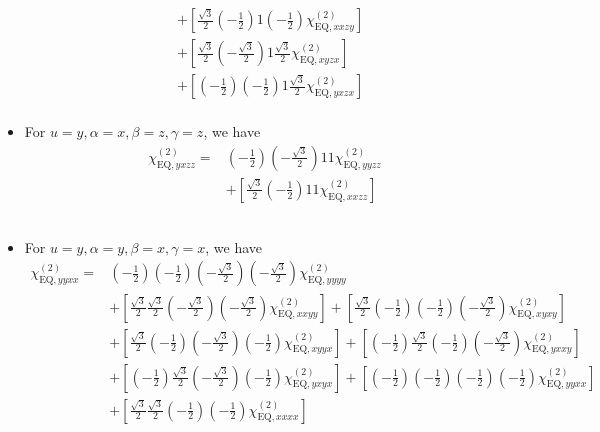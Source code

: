 \documentclass[UTF8,10pt,a4paper]{article}
\begin{document}
\begin{itemize}
\begin{align}
\nonumber&+\left[\frac{\sqrt{3}}{2}\left(-\frac{1}{2}\right)1\left(-\frac{1}{2}\right)\chi_{\text{EQ},xxzy}^{(2)}\right]\\
\nonumber&+\left[\frac{\sqrt{3}}{2}\left(-\frac{\sqrt{3}}{2}\right)1\frac{\sqrt{3}}{2}\chi_{\text{EQ},xyzx}^{(2)}\right]\\
\nonumber&+\left[\left(-\frac{1}{2}\right)\left(-\frac{1}{2}\right)1\frac{\sqrt{3}}{2}\chi_{\text{EQ},yxzx}^{(2)}\right]\\
&
\end{align}\normalsize
\item For $u=y,\alpha=x,\beta=z,\gamma=z$, we have
\footnotesize\begin{align}
\nonumber\chi_{\text{EQ},yxzz}^{(2)}=&\left(-\frac{1}{2}\right)\left(-\frac{\sqrt{3}}{2}\right)11\chi_{\text{EQ},yyzz}^{(2)}\\
\nonumber&+\left[\frac{\sqrt{3}}{2}\left(-\frac{1}{2}\right)11\chi_{\text{EQ},xxzz}^{(2)}\right]\\
\nonumber&\\
\nonumber&\\
&
\end{align}\normalsize
\item For $u=y,\alpha=y,\beta=x,\gamma=x$, we have
\footnotesize\begin{align}
\nonumber\chi_{\text{EQ},yyxx}^{(2)}=&\left(-\frac{1}{2}\right)\left(-\frac{1}{2}\right)\left(-\frac{\sqrt{3}}{2}\right)\left(-\frac{\sqrt{3}}{2}\right)\chi_{\text{EQ},yyyy}^{(2)}\\
\nonumber&+\left[\frac{\sqrt{3}}{2}\frac{\sqrt{3}}{2}\left(-\frac{\sqrt{3}}{2}\right)\left(-\frac{\sqrt{3}}{2}\right)\chi_{\text{EQ},xxyy}^{(2)}\right]+\left[\frac{\sqrt{3}}{2}\left(-\frac{1}{2}\right)\left(-\frac{1}{2}\right)\left(-\frac{\sqrt{3}}{2}\right)\chi_{\text{EQ},xyxy}^{(2)}\right]\\
\nonumber&+\left[\frac{\sqrt{3}}{2}\left(-\frac{1}{2}\right)\left(-\frac{\sqrt{3}}{2}\right)\left(-\frac{1}{2}\right)\chi_{\text{EQ},xyyx}^{(2)}\right]+\left[\left(-\frac{1}{2}\right)\frac{\sqrt{3}}{2}\left(-\frac{1}{2}\right)\left(-\frac{\sqrt{3}}{2}\right)\chi_{\text{EQ},yxxy}^{(2)}\right]\\
\nonumber&+\left[\left(-\frac{1}{2}\right)\frac{\sqrt{3}}{2}\left(-\frac{\sqrt{3}}{2}\right)\left(-\frac{1}{2}\right)\chi_{\text{EQ},yxyx}^{(2)}\right]+\left[\left(-\frac{1}{2}\right)\left(-\frac{1}{2}\right)\left(-\frac{1}{2}\right)\left(-\frac{1}{2}\right)\chi_{\text{EQ},yyxx}^{(2)}\right]\\
&+\left[\frac{\sqrt{3}}{2}\frac{\sqrt{3}}{2}\left(-\frac{1}{2}\right)\left(-\frac{1}{2}\right)\chi_{\text{EQ},xxxx}^{(2)}\right]

\end{align}
\end{itemize}
\end{document}
